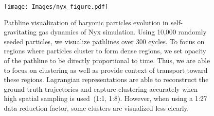 \begin{figure}[!t]
\centering
\texttt{[image: Images/nyx\_figure.pdf]}
\vspace{-5mm}
\caption{Pathline visualization of baryonic particles evolution in self-gravitating gas dynamics of Nyx simulation. Using 10,000 randomly seeded particles, we visualize pathlines over 300 cycles. To focus on regions where particles cluster to form dense regions, we set opacity of the pathline to be directly proportional to time. Thus, we are able to focus on clustering as well as provide context of transport toward these regions. Lagrangian representations are able to reconstruct the ground truth trajectories and capture clustering accurately when high spatial sampling is used~(1:1, 1:8). However, when using a 1:27 data reduction factor, some clusters are visualized less clearly.} 
\vspace{-5mm}
\label{fig:nyx_figure}
\end{figure}
